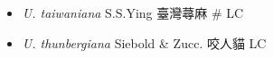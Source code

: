 \begin{itemize}
  \begin{itemize}
        \item[] \textit{U. taiwaniana} S.S.Ying  臺灣蕁麻  \# LC
        \item[] \textit{U. thunbergiana} Siebold \& Zucc.  咬人貓   LC
  \end{itemize}
  \end{itemize}
